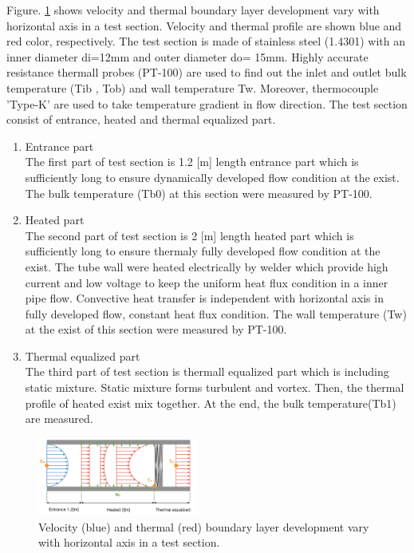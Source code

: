 \documentclass[conference]{IEEEtran}
\begin{document}
Figure. \ref{thermal_boundary_layer_development} shows velocity and thermal boundary layer development vary with horizontal axis in a test section.
Velocity and thermal profile are shown blue and red color, respectively.
The test section is made of stainless steel (1.4301) with an inner diameter di=12mm and outer diameter do= 15mm.
Highly accurate resistance thermall probes (PT-100) are used to find out the inlet and outlet bulk temperature (Tib , Tob) and wall temperature Tw.
Moreover, thermocouple 'Type-K' are used to take temperature gradient in flow direction.
\newpage
The test section consist of entrance, heated and thermal equalized part.
\begin{enumerate}
  \item Entrance part\\
  The first part of test section is 1.2 [m] length entrance part which is sufficiently long to ensure dynamically developed flow condition at the exist.
  The bulk temperature (Tb0) at this section were measured by PT-100.
  \item Heated part\\
  The second part of test section is 2 [m] length heated part which is sufficiently long to ensure thermaly fully developed flow condition at the exist.
  The tube wall were heated electrically by welder which provide high current and low voltage to keep the uniform heat flux condition in a inner pipe flow. 
  Convective heat transfer is independent with horizontal axis in fully developed flow, constant heat flux condition.
  The wall temperature (Tw) at the exist of this section were measured by PT-100.
  \item Thermal equalized part\\
  The third part of test section is thermall equalized part which is including static mixture. Static mixture forms turbulent and vortex. Then, the thermal profile of heated exist mix together. At the end, the bulk temperature(Tb1) are measured.
\end{enumerate}


\begin{figure}[htbp]
  \centering
\includegraphics[width=0.47\textwidth,natwidth=850,natheight=450]{fig/thermal_boundary_layer_development.png}
  \caption{Velocity (blue) and thermal (red) boundary layer development vary with horizontal axis in a test section.}
  \label{thermal_boundary_layer_development}
\end{figure}
\end{document}
